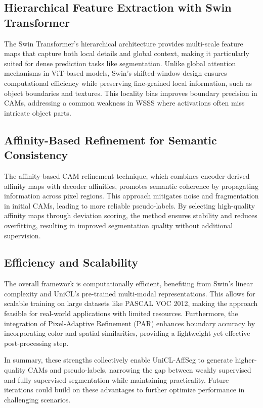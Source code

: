 \subsection{Hierarchical Feature Extraction with Swin Transformer}
The Swin Transformer's hierarchical architecture provides multi-scale feature maps that capture both local details and global context, making it particularly suited for dense prediction tasks like segmentation. Unlike global attention mechanisms in ViT-based models, Swin's shifted-window design ensures computational efficiency while preserving fine-grained local information, such as object boundaries and textures. This locality bias improves boundary precision in CAMs, addressing a common weakness in WSSS where activations often miss intricate object parts.

\subsection{Affinity-Based Refinement for Semantic Consistency}
The affinity-based CAM refinement technique, which combines encoder-derived affinity maps with decoder affinities, promotes semantic coherence by propagating information across pixel regions. This approach mitigates noise and fragmentation in initial CAMs, leading to more reliable pseudo-labels. By selecting high-quality affinity maps through deviation scoring, the method ensures stability and reduces overfitting, resulting in improved segmentation quality without additional supervision.

\subsection{Efficiency and Scalability}
The overall framework is computationally efficient, benefiting from Swin's linear complexity and UniCL's pre-trained multi-modal representations. This allows for scalable training on large datasets like PASCAL VOC 2012, making the approach feasible for real-world applications with limited resources. Furthermore, the integration of Pixel-Adaptive Refinement (PAR) enhances boundary accuracy by incorporating color and spatial similarities, providing a lightweight yet effective post-processing step.

In summary, these strengths collectively enable UniCL-AffSeg to generate higher-quality CAMs and pseudo-labels, narrowing the gap between weakly supervised and fully supervised segmentation while maintaining practicality. Future iterations could build on these advantages to further optimize performance in challenging scenarios.